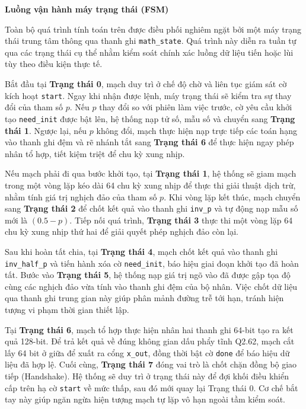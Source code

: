 \textbf{Luồng vận hành máy trạng thái (FSM)}

Toàn bộ quá trình tính toán trên được điều phối nghiêm ngặt bởi một máy trạng thái trung tâm thông qua thanh ghi \texttt{math\_state}. Quá trình này diễn ra tuần tự qua các trạng thái cụ thể nhằm kiểm soát chính xác luồng dữ liệu tiến hoặc lùi tùy theo điều kiện thực tế.

Bắt đầu tại \textbf{Trạng thái 0}, mạch duy trì ở chế độ chờ và liên tục giám sát cờ kích hoạt \texttt{start}. Ngay khi nhận được lệnh, máy trạng thái sẽ kiểm tra sự thay đổi của tham số $p$. Nếu $p$ thay đổi so với phiên làm việc trước, cờ yêu cầu khởi tạo \texttt{need\_init} được bật lên, hệ thống nạp tử số, mẫu số và chuyển sang \textbf{Trạng thái 1}. Ngược lại, nếu $p$ không đổi, mạch thực hiện nạp trực tiếp các toán hạng vào thanh ghi đệm và rẽ nhánh tắt sang \textbf{Trạng thái 6} để thực hiện ngay phép nhân tổ hợp, tiết kiệm triệt để chu kỳ xung nhịp.

Nếu mạch phải đi qua bước khởi tạo, tại \textbf{Trạng thái 1}, hệ thống sẽ giam mạch trong một vòng lặp kéo dài 64 chu kỳ xung nhịp để thực thi giải thuật dịch trừ, nhằm tính giá trị nghịch đảo của tham số $p$. Khi vòng lặp kết thúc, mạch chuyển sang \textbf{Trạng thái 2} để chốt kết quả vào thanh ghi \texttt{inv\_p} và tự động nạp mẫu số mới là $(0.5 - p)$. Tiếp nối quá trình, \textbf{Trạng thái 3} thực thi một vòng lặp 64 chu kỳ xung nhịp thứ hai để giải quyết phép nghịch đảo còn lại. 

Sau khi hoàn tất chia, tại \textbf{Trạng thái 4}, mạch chốt kết quả vào thanh ghi \texttt{inv\_half\_p} và tiến hành xóa cờ \texttt{need\_init}, báo hiệu giai đoạn khởi tạo đã hoàn tất. Bước vào \textbf{Trạng thái 5}, hệ thống nạp giá trị ngõ vào đã được gập tọa độ cùng các nghịch đảo vừa tính vào thanh ghi đệm của bộ nhân. Việc chốt dữ liệu qua thanh ghi trung gian này giúp phân mảnh đường trễ tới hạn, tránh hiện tượng vi phạm thời gian thiết lập.

Tại \textbf{Trạng thái 6}, mạch tổ hợp thực hiện nhân hai thanh ghi 64-bit tạo ra kết quả 128-bit. Để trả kết quả về đúng không gian dấu phẩy tĩnh Q2.62, mạch cắt lấy 64 bit ở giữa để xuất ra cổng \texttt{x\_out}, đồng thời bật cờ \texttt{done} để báo hiệu dữ liệu đã hợp lệ. Cuối cùng, \textbf{Trạng thái 7} đóng vai trò là chốt chặn đồng bộ giao tiếp (Handshake). Hệ thống sẽ duy trì ở trạng thái này để đợi khối điều khiển cấp trên hạ cờ \texttt{start} về mức thấp, sau đó mới quay lại Trạng thái 0. Cơ chế bắt tay này giúp ngăn ngừa hiện tượng mạch tự lặp vô hạn ngoài tầm kiểm soát.

